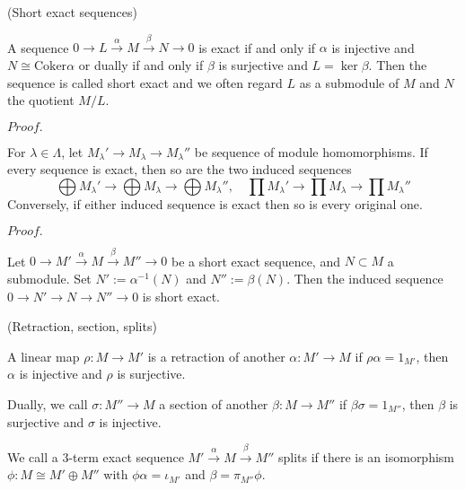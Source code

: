 \documentclass{article}
\newcommand{\Pf}[1]{$Proof.$\par}
\begin{document}
\begin{definition}
    (Short exact sequences)\par
    A sequence $0\to L \overset{\alpha}{\to} M \overset{\beta}{\to} N \to 0$ is exact if and only if $\alpha$ is injective and $N \cong \text{Coker}\alpha$ or dually if and only if $\beta$ is surjective and $L =\ker\beta$. Then the sequence is called short exact and we often regard $L$ as a submodule of $M$ and $N$ the quotient $M/L$.
\end{definition}
\Pf\par

\begin{proposition}
    For $\lambda \in \Lambda$, let $M_{\lambda}' \to M_{\lambda} \to M_{\lambda}''$ be sequence of module homomorphisms. If every sequence is exact, then so are the two induced sequences
    \[
    \bigoplus M_{\lambda}' \to \bigoplus M_{\lambda} \to \bigoplus M_{\lambda}'', \quad \prod M_{\lambda}' \to \prod M_{\lambda} \to \prod M_{\lambda}'' 
    \]
    Conversely, if either induced sequence is exact then so is every original one.
\end{proposition}
\Pf\par

\begin{proposition}
    Let $0\to M'\overset{\alpha}{\to} M \overset{\beta}{\to} M'' \to 0$ be a short exact sequence, and $N\subset M$ a submodule. Set $N':=\alpha^{-1}(N)$ and $N'':= \beta(N)$. Then the induced sequence $0 \to N' \to N \to N'' \to 0$ is short exact.
\end{proposition}

\begin{definition}
    (Retraction, section, splits)\par
    A linear map $\rho: M \to M'$ is a retraction of another $\alpha:M'\to M$ if $\rho\alpha = 1_{M'}$, then $\alpha$ is injective and $\rho$ is surjective.\par
    Dually, we call $\sigma:M''\to M$ a section of another $\beta:M\to M''$ if $\beta\sigma = 1_{M''}$, then $\beta$ is surjective and $\sigma$ is injective.\par
    We call a $3$-term exact sequence $M' \overset{\alpha}{\to} M \overset{\beta}{\to} M''$ splits if there is an isomorphism $\phi:M\cong M'\oplus M''$ with $\phi\alpha = \iota_{M'}$ and $\beta = \pi_{M''}\phi$.
\end{definition}
    
\end{document}
